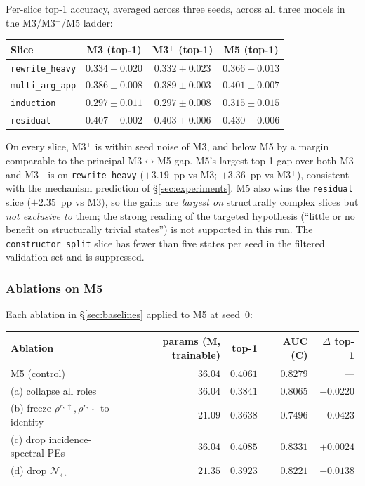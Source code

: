 \documentclass[11pt]{article}
\theoremstyle{definition}
\theoremstyle{plain}
\begin{document}
Per-slice top-1 accuracy, averaged across three seeds, across all three
models in the M3/M3$^{+}$/M5 ladder:

\begin{center}
\small
\begin{tabular}{lccc}
\toprule
Slice & M3 (top-1) & M3$^{+}$ (top-1) & M5 (top-1) \\
\midrule
\texttt{rewrite\_heavy} & $0.334 \pm 0.020$ & $0.332 \pm 0.023$ & $0.366 \pm 0.013$ \\
\texttt{multi\_arg\_app} & $0.386 \pm 0.008$ & $0.389 \pm 0.003$ & $0.401 \pm 0.007$ \\
\texttt{induction} & $0.297 \pm 0.011$ & $0.297 \pm 0.008$ & $0.315 \pm 0.015$ \\
\texttt{residual} & $0.407 \pm 0.002$ & $0.403 \pm 0.006$ & $0.430 \pm 0.006$ \\
\bottomrule
\end{tabular}
\end{center}

\noindent On every slice, M3$^{+}$ is within seed noise of M3, and below M5
by a margin comparable to the principal M3$\leftrightarrow$M5 gap. M5's
largest top-1 gap over both M3 and M3$^{+}$ is on \texttt{rewrite\_heavy}
($+3.19$~pp vs M3; $+3.36$~pp vs M3$^{+}$), consistent with the mechanism
prediction of \S\ref{sec:experiments}. M5 also wins the \texttt{residual}
slice ($+2.35$~pp vs M3), so the gains are \emph{largest on} structurally
complex slices but \emph{not exclusive to} them; the strong reading of the
targeted hypothesis (``little or no benefit on structurally trivial
states'') is not supported in this run. The \texttt{constructor\_split}
slice has fewer than five states per seed in the filtered validation set
and is suppressed.

\subsubsection*{Ablations on M5}

Each ablation in \S\ref{sec:baselines} applied to M5 at seed~$0$:

\begin{center}
\small
\begin{tabular}{lrrrr}
\toprule
Ablation & params (M, trainable) & top-1 & AUC (C) & $\Delta$ top-1 \\
\midrule
M5 (control) & $36.04$ & $0.4061$ & $0.8279$ & --- \\
(a) collapse all roles & $36.04$ & $0.3841$ & $0.8065$ & $-0.0220$ \\
(b) freeze $\rho^{r,\uparrow}, \rho^{r,\downarrow}$ to identity & $21.09$ & $0.3638$ & $0.7496$ & $-0.0423$ \\
(c) drop incidence-spectral PEs & $36.04$ & $0.4085$ & $0.8331$ & $+0.0024$ \\
(d) drop $\mathcal{N}_{\leftrightarrow}$ & $21.35$ & $0.3923$ & $0.8221$ & $-0.0138$ \\
\bottomrule
\end{tabular}
\end{center}
\end{document}
